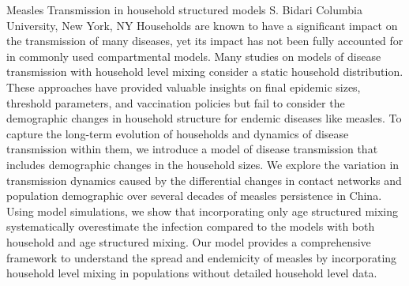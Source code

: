 
    \begin{abstract_online}{Measles Transmission in household structured models}{%
        S. Bidari}{%
        }{%
        Columbia University, New York, NY}
    Households are known to have a significant impact on the transmission of many diseases, yet its impact has not been fully accounted for in commonly used compartmental models. Many studies on models of disease transmission with household level mixing consider a static household distribution. These approaches have provided valuable insights on final epidemic sizes, threshold parameters, and vaccination policies but fail to consider the demographic changes in household structure for endemic diseases like measles. To capture the long-term evolution of households and dynamics of disease transmission within them, we introduce a model of disease transmission that includes demographic changes in the household sizes. We explore the variation in transmission dynamics caused by the differential changes in contact networks and population demographic over several decades of measles persistence in China. Using model simulations, we show that incorporating only age structured mixing systematically overestimate the infection compared to the models with both household and age structured mixing. Our model provides a comprehensive framework to understand the spread and endemicity of measles by incorporating household level mixing in populations without detailed household level data. 
    
    \end{abstract_online}
    